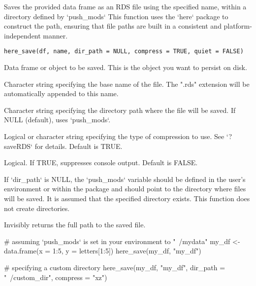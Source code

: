 \documentclass[a4paper]{book}
\begin{document}
%
\begin{Description}
Saves the provided data frame as an RDS file using the specified name, within a directory defined by `push\_mods`
This function uses the `here` package to construct the path, ensuring that file paths are built in a consistent and platform-independent manner.
\end{Description}
%
\begin{Usage}
\begin{verbatim}
here_save(df, name, dir_path = NULL, compress = TRUE, quiet = FALSE)
\end{verbatim}
\end{Usage}
%
\begin{Arguments}
\begin{ldescription}
\item[\code{df}] Data frame or object to be saved. This is the object you want to persist on disk.

\item[\code{name}] Character string specifying the base name of the file. The ".rds" extension will be automatically appended to this name.

\item[\code{dir\_path}] Character string specifying the directory path where the file will be saved. If NULL (default), uses `push\_mods`.

\item[\code{compress}] Logical or character string specifying the type of compression to use. See `?saveRDS` for details. Default is TRUE.

\item[\code{quiet}] Logical. If TRUE, suppresses console output. Default is FALSE.
\end{ldescription}
\end{Arguments}
%
\begin{Details}
If `dir\_path` is NULL, the `push\_mods` variable should be defined in the user's environment or within the package and should point to the directory where files will be saved.
It is assumed that the specified directory exists. This function does not create directories.
\end{Details}
%
\begin{Value}
Invisibly returns the full path to the saved file.
\end{Value}
%
\begin{Examples}
\begin{ExampleCode}
# assuming `push_mods` is set in your environment to "~/mydata"
my_df <- data.frame(x = 1:5, y = letters[1:5])
here_save(my_df, "my_df")

# specifying a custom directory
here_save(my_df, "my_df", dir_path = "~/custom_dir", compress = "xz")

\end{ExampleCode}
\end{Examples}
\end{document}
